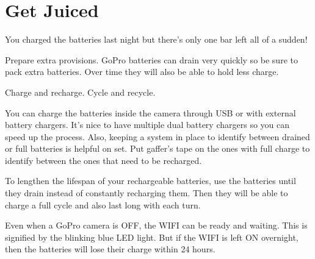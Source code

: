 \chapter{Get Juiced}
\pagecolor{white}
\label{chap:7}
\begin{fullwidth}


\problem

{\large You charged the batteries last night but there’s only one bar left all of a sudden!
 \par}

Prepare extra provisions. GoPro batteries can drain very quickly so be sure to pack extra batteries. Over time they will also be able to hold less charge. 


\solution

{\large Charge and recharge. Cycle and recycle. 
 \par}

You can charge the batteries inside the camera through USB or with external battery chargers. It’s nice to have multiple dual battery chargers so you can speed up the process. Also, keeping a system in place to identify between drained or full batteries is helpful on set. Put gaffer’s tape on the ones with full charge to identify between the ones that need to be recharged. 

To lengthen the lifespan of your rechargeable batteries, use the batteries until they drain instead of constantly recharging them. Then they will be able to charge a full cycle and also last long with each turn. 

\tip Even when a GoPro camera is OFF, the WIFI can be ready and waiting. This is signified by the blinking blue LED light. But if the WIFI is left ON overnight, then the batteries will lose their charge within 24 hours.




\clearpage
\end{fullwidth}
